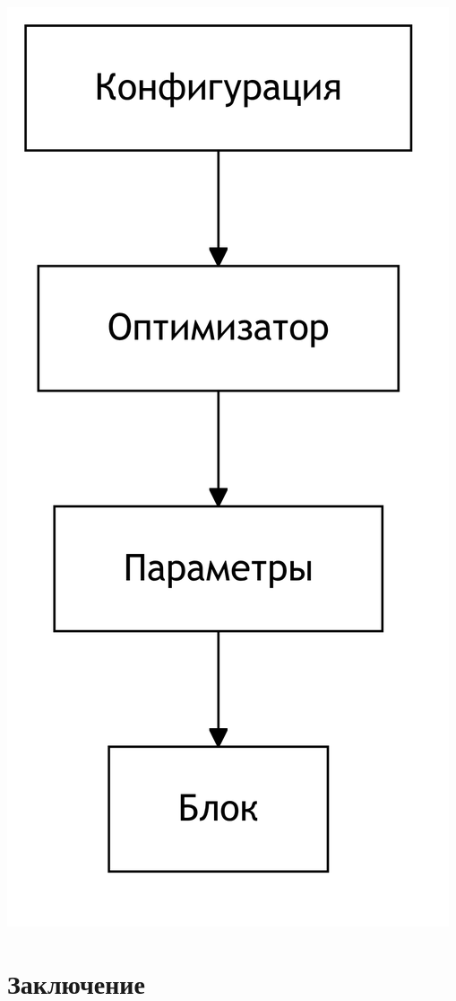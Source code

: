 \documentclass[14pt,a4paper,oneside,openany]{extbook}
\begin{document}
\begin{center}
\includegraphics[width=.9\linewidth]{img/mermaid/optimization_schema.png}
\label{}
\end{center}
\chapter*{Заключение}
\label{sec:orge488adb}
\printbibliography[title=СПИСОК\spaceИСПОЛЬЗОВАНЫХ\spaceИСТОЧНИКОВ]
\end{document}
